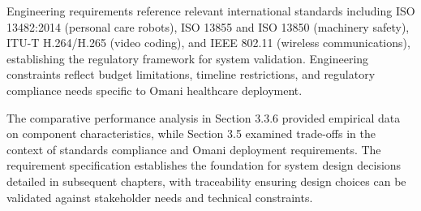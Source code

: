 Engineering requirements reference relevant international standards including ISO 13482:2014 (personal care robots), ISO 13855 and ISO 13850 (machinery safety), ITU-T H.264/H.265 (video coding), and IEEE 802.11 (wireless communications), establishing the regulatory framework for system validation. Engineering constraints reflect budget limitations, timeline restrictions, and regulatory compliance needs specific to Omani healthcare deployment.

The comparative performance analysis in Section 3.3.6 provided empirical data on component characteristics, while Section 3.5 examined trade-offs in the context of standards compliance and Omani deployment requirements. The requirement specification establishes the foundation for system design decisions detailed in subsequent chapters, with traceability ensuring design choices can be validated against stakeholder needs and technical constraints.
